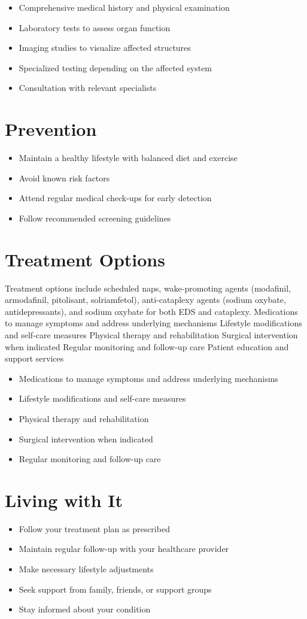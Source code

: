 \begin{itemize}[noitemsep]
  \item Comprehensive medical history and physical examination
  \item Laboratory tests to assess organ function
  \item Imaging studies to visualize affected structures
  \item Specialized testing depending on the affected system
  \item Consultation with relevant specialists
\end{itemize}
\section{Prevention}
\begin{itemize}[noitemsep]
  \item Maintain a healthy lifestyle with balanced diet and exercise
  \item Avoid known risk factors
  \item Attend regular medical check-ups for early detection
  \item Follow recommended screening guidelines
\end{itemize}
\section{Treatment Options}
Treatment options include scheduled naps, wake-promoting agents (modafinil, armodafinil, pitolisant, solriamfetol), anti-cataplexy agents (sodium oxybate, antidepressants), and sodium oxybate for both EDS and cataplexy. Medications to manage symptoms and address underlying mechanisms Lifestyle modifications and self-care measures Physical therapy and rehabilitation Surgical intervention when indicated Regular monitoring and follow-up care Patient education and support services

\begin{itemize}[noitemsep]
  \item Medications to manage symptoms and address underlying mechanisms
  \item Lifestyle modifications and self-care measures
  \item Physical therapy and rehabilitation
  \item Surgical intervention when indicated
  \item Regular monitoring and follow-up care
\end{itemize}
\section{Living with It}
\begin{itemize}[noitemsep]
  \item Follow your treatment plan as prescribed
  \item Maintain regular follow-up with your healthcare provider
  \item Make necessary lifestyle adjustments
  \item Seek support from family, friends, or support groups
  \item Stay informed about your condition
\end{itemize}
